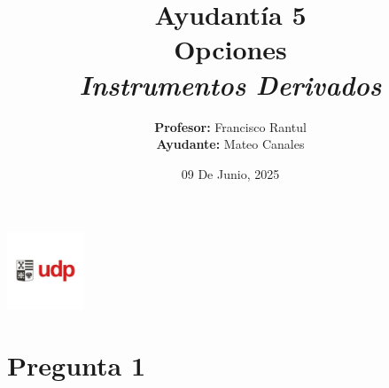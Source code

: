 \documentclass{beamer}
\title{Ayudantía 5 \\ Opciones
\\ \large\textit{Instrumentos Derivados}}
\author{
  \texorpdfstring{
    \textbf{Profesor:} Francisco Rantul \\[0.3em]
    \textbf{Ayudante:} Mateo Canales
  }{Profesor: Francisco Rantul, Ayudante: Mateo Canales}
}
\institute{Universidad Diego Portales}
\date{09 De Junio, 2025}
\begin{document}
\begin{frame}
    \titlepage
    \vfill
    \centering
    \includegraphics[width=2.3118cm]{../imagenes/logo.png}
  \end{frame}

\newcommand{\cajaverde}[1]{%
  \fcolorbox{blue}{green!20}{%
    { #1}%
  }
}
\newcommand{\cajaverdeletra}[1]{%
  \fcolorbox{blue}{green!20}{%
    \parbox{0.9\linewidth}{\justifying #1}%
  }
}
\newcommand{\formula}[1]{\textcolor{blue}{#1}}
\newcommand{\entero}[1]{\pgfmathprintnumber[fixed, precision=0]{#1}}
\newcommand{\decimal}[1]{\pgfmathprintnumber[fixed, precision=2]{#1}}
\newcommand{\decimalx}[1]{\pgfmathprintnumber[fixed, precision=3]{#1}}
\newcommand{\decimalxx}[1]{\pgfmathprintnumber[fixed, precision=4]{#1}}
\newcommand{\porcentaje}[1]{%
  \pgfmathsetmacro{\temp}{#1*100}%
  \pgfmathprintnumber[fixed, precision=2]{\temp}\%%
  }
\newcommand{\dinero}[1]{%
  \$\,\pgfmathprintnumber[fixed, precision=0]{#1}
  }
\newcommand{\dineros}[1]{%
  \$\,\pgfmathprintnumber[fixed, precision=1]{#1}
  }
\newcommand{\dineross}[1]{%
  \$\,\pgfmathprintnumber[fixed, precision=2]{#1}
  }
\newcommand{\Desarrollo}[1]{Desarrollo Parte {#1})}





\section{Pregunta 1}

\newcommand{\Suno}{50}
\newcommand{\Kuno}{50}
\newcommand{\rdiez}{0.10}
\newcommand{\sigmaPuno}{0.30}
\newcommand{\Tuno}{0.25}
\newcommand{\Divuno}{1.5}
\newcommand{\Tdos}{\frac{2}{12}} %

\newcommand{\callbsm}{$c =  S_0 \cdot N(d_1)- K \cdot e^{-r \cdot (T)} \cdot N(d_2) $}
\newcommand{\putbsm}{$p = K \cdot e^{-r \cdot (T)} \cdot N(-d_2) - S_0 \cdot N(-d_1)$}
\newcommand{\Duno }{$  d_1 = \frac{\ln(S_0 / K) + \left( r + \frac{\sigma^2}{2} \right) \cdot T}{\sigma \cdot \sqrt{T}}$}
\newcommand{\Ddos}{$d_2 = d_1 - \sigma \cdot \sqrt{T}$}
\newcommand{\dividendo}{$S_1 = S_0 - e^{-r \cdot t} \cdot div $}
\newcommand{\vp}{$vp =e^{-r \cdot t} \cdot valor futuro $}
\end{document}
